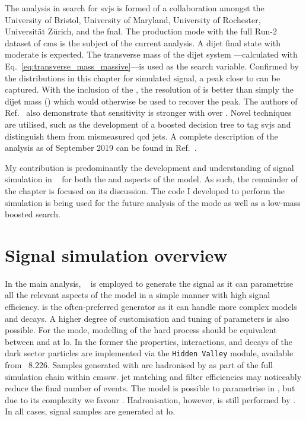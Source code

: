 The analysis in search for \glspl{svj} is formed of a collaboration amongst the University of Bristol, University of Maryland, University of Rochester, Universit\"{a}t Z\"{u}rich, and the \acrfull{fnal}. The \schannel production mode with the full Run-2 dataset of \acrshort{cms} is the subject of the current analysis. A dijet final state with moderate \ptmiss is expected. The transverse mass of the dijet system \mT---calculated with Eq.~\ref{eq:transverse_mass_massive}---is used as the search variable. Confirmed by the distributions in this chapter for simulated signal, a peak close to \mZprime can be captured. With the inclusion of the \ptmiss, the resolution of \mT is better than simply the dijet mass (\mjj) which would otherwise be used to recover the peak. The authors of Ref.~ also demonstrate that sensitivity is stronger with \mT over \mjj. Novel techniques are utilised, such as the development of a boosted decision tree to tag \glspl{svj} and distinguish them from mismeasured \acrshort{qcd} \glspl{jet}. A complete description of the \schannel analysis as of September 2019 can be found in Ref.~.

My contribution is predominantly the development and understanding of signal simulation in \MGvATNLO~\cite{Alwall:2011madgraph} for both the \schannel and \tchannel aspects of the model. As such, the remainder of the chapter is focused on its discussion. The code I developed to perform the simulation is being used for the future analysis of the \tchannel mode as well as a low-mass boosted \PZprime search.




\section{Signal simulation overview}
\label{sec:signal_sim}

In the main analysis, \PYTHIAEIGHT~\cite{pythia82} is employed to generate the \schannel signal as it can parametrise all the relevant aspects of the model in a simple manner with high signal efficiency. \MADGRAPH is the often-preferred generator as it can handle more complex models and decays. A higher degree of customisation and tuning of parameters is also possible. For the \schannel mode, modelling of the hard process should be equivalent between \PYTHIA and \MADGRAPH at \acrfull{lo}. In the former the properties, interactions, and decays of the dark sector particles are implemented via the \texttt{Hidden Valley} module, available from \PYTHIA~8.226. Samples generated with \MADGRAPH are hadronised by \PYTHIA as part of the full simulation chain within \acrshort{cmssw}. \Gls{jet} matching and filter efficiencies may noticeably reduce the final number of events. The \tchannel model is possible to parametrise in \PYTHIA, but due to its complexity we favour \MADGRAPH. Hadronisation, however, is still performed by \PYTHIA. In all cases, signal samples are generated at \acrshort{lo}.


